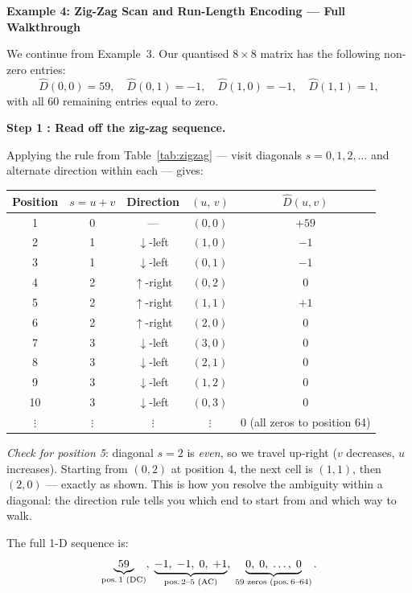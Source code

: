 \begin{examplebox}
\textbf{Example 4: Zig-Zag Scan and Run-Length Encoding — Full Walkthrough}

\medskip
\noindent We continue from Example~3.  Our quantised $8\times8$ matrix has
the following non-zero entries:
\[
  \hat{D}(0,0)=59,\quad
  \hat{D}(0,1)=-1,\quad
  \hat{D}(1,0)=-1,\quad
  \hat{D}(1,1)=1,
\]
with all 60 remaining entries equal to zero.

\medskip
\noindent\textbf{Step 1 : Read off the zig-zag sequence.}

\noindent Applying the rule from Table~\ref{tab:zigzag} — visit diagonals $s=0,1,2,\ldots$ and alternate direction within each — gives:

\begin{center}
\setlength{\tabcolsep}{5pt}
\begin{tabular}{ccccc}
\toprule
Position & $s{=}u{+}v$ & Direction & $(u,\,v)$ & $\hat{D}(u,v)$ \\
\midrule
1 & 0 & — & $(0,0)$ & $+59$ \quad [DC coefficient] \\
2 & 1 & $\downarrow$-left & $(1,0)$ & $-1$ \\
3 & 1 & $\downarrow$-left & $(0,1)$ & $-1$ \\
4 & 2 & $\uparrow$-right & $(0,2)$ & $0$ \\
5 & 2 & $\uparrow$-right & $(1,1)$ & $+1$ \\
6 & 2 & $\uparrow$-right & $(2,0)$ & $0$ \\
7 & 3 & $\downarrow$-left & $(3,0)$ & $0$ \\
8 & 3 & $\downarrow$-left & $(2,1)$ & $0$ \\
9 & 3 & $\downarrow$-left & $(1,2)$ & $0$ \\
10 & 3 & $\downarrow$-left & $(0,3)$ & $0$ \\
$\vdots$ & $\vdots$ & $\vdots$ & $\vdots$ & $0$ \quad (all zeros to position 64) \\
\bottomrule
\end{tabular}
\end{center}

\noindent\textit{Check for position 5}: diagonal $s=2$ is \emph{even}, so we travel up-right ($v$ decreases, $u$ increases). Starting from $(0,2)$ at position 4, the next cell is $(1,1)$, then $(2,0)$ — exactly as shown. This is how you resolve the ambiguity within a diagonal: the direction rule tells you which end to start from and which way to walk.

\noindent The full 1-D sequence is:
\[
  \underbrace{59}_{\text{pos.\,1 (DC)}},\;
  \underbrace{-1,\;-1,\;0,\;+1}_{\text{pos.\,2--5 (AC)}},\;
  \underbrace{0,\;0,\;\ldots,\;0}_{59\text{ zeros (pos.\,6--64)}}.
\]


\end{examplebox}
